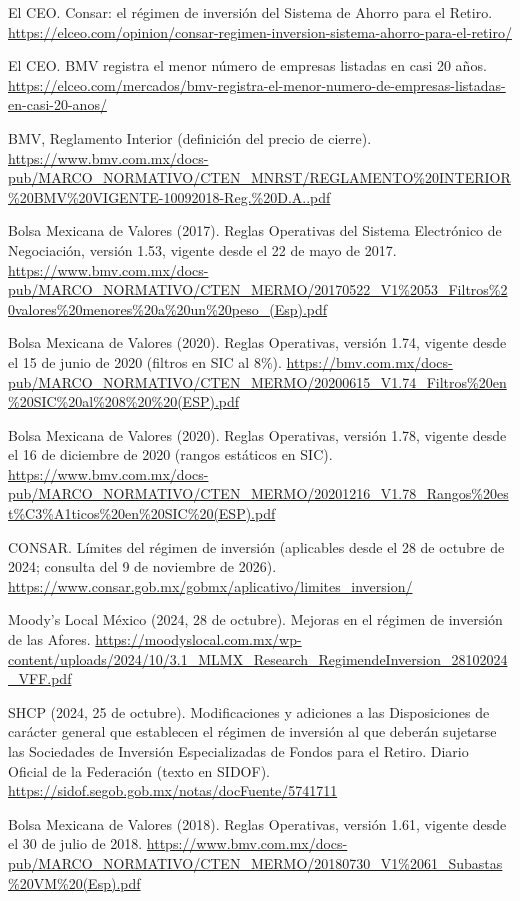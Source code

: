 \documentclass[11pt,letterpaper]{article}
\theoremstyle{definition}
\theoremstyle{plain}
\begin{document}
\begin{enumerate}[label={[\arabic*]},leftmargin=*]
\item El CEO. Consar: el régimen de inversión del Sistema de Ahorro para el Retiro. \url{https://elceo.com/opinion/consar-regimen-inversion-sistema-ahorro-para-el-retiro/}
\item El CEO. BMV registra el menor número de empresas listadas en casi 20 años. \url{https://elceo.com/mercados/bmv-registra-el-menor-numero-de-empresas-listadas-en-casi-20-anos/}
\item BMV, Reglamento Interior (definición del precio de cierre). \url{https://www.bmv.com.mx/docs-pub/MARCO_NORMATIVO/CTEN_MNRST/REGLAMENTO\%20INTERIOR\%20BMV\%20VIGENTE-10092018-Reg.\%20D.A..pdf}
\item Bolsa Mexicana de Valores (2017). Reglas Operativas del Sistema Electrónico de Negociación, versión 1.53, vigente desde el 22 de mayo de 2017. \url{https://www.bmv.com.mx/docs-pub/MARCO_NORMATIVO/CTEN_MERMO/20170522_V1%2053_Filtros%20valores%20menores%20a%20un%20peso_(Esp).pdf}
\item Bolsa Mexicana de Valores (2020). Reglas Operativas, versión 1.74, vigente desde el 15 de junio de 2020 (filtros en SIC al 8\%). \url{https://bmv.com.mx/docs-pub/MARCO_NORMATIVO/CTEN_MERMO/20200615_V1.74_Filtros%20en%20SIC%20al%208%20%20(ESP).pdf}
\item Bolsa Mexicana de Valores (2020). Reglas Operativas, versión 1.78, vigente desde el 16 de diciembre de 2020 (rangos estáticos en SIC). \url{https://www.bmv.com.mx/docs-pub/MARCO_NORMATIVO/CTEN_MERMO/20201216_V1.78_Rangos%20est%C3%A1ticos%20en%20SIC%20(ESP).pdf}
\item CONSAR. Límites del régimen de inversión (aplicables desde el 28 de octubre de 2024; consulta del 9 de noviembre de 2026). \url{https://www.consar.gob.mx/gobmx/aplicativo/limites_inversion/}
\item Moody's Local México (2024, 28 de octubre). Mejoras en el régimen de inversión de las Afores. \url{https://moodyslocal.com.mx/wp-content/uploads/2024/10/3.1_MLMX_Research_RegimendeInversion_28102024_VFF.pdf}
\item SHCP (2024, 25 de octubre). Modificaciones y adiciones a las Disposiciones de carácter general que establecen el régimen de inversión al que deberán sujetarse las Sociedades de Inversión Especializadas de Fondos para el Retiro. Diario Oficial de la Federación (texto en SIDOF). \url{https://sidof.segob.gob.mx/notas/docFuente/5741711}
\item Bolsa Mexicana de Valores (2018). Reglas Operativas, versión 1.61, vigente desde el 30 de julio de 2018. \url{https://www.bmv.com.mx/docs-pub/MARCO_NORMATIVO/CTEN_MERMO/20180730_V1%2061_Subastas%20VM%20(Esp).pdf}

\end{enumerate}
\end{document}
